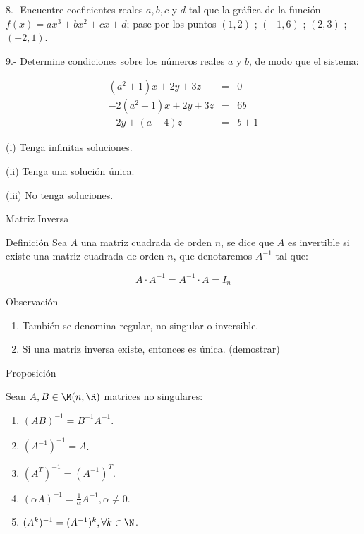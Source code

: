 8.- Encuentre coeficientes reales $a, b, c$ y $d$ tal que la gráfica
  de la función $f(x)= ax^3 + bx^2+ cx + d$;
pase por los puntos $(1,2)$ ; $(-1,6)$ ; $(2,3)$ ; $(-2,1)$.

9.- Determine condiciones sobre los números reales $a$ y $b$,
 de modo que el sistema:
 
 \begin{eqnarray*}
(a^2+1)x   +  2y + 3z     &=& 0\\
-2(a^2+1)x +  2y + 3z     &=& 6b\\
           -  2y + (a-4)z &=& b+1
\end{eqnarray*}

(i) Tenga infinitas soluciones.

(ii) Tenga una solución única.

(iii) No tenga soluciones.


{Matriz Inversa}

\begin{block}{Definición}
Sea $A$ una matriz cuadrada de orden $n$, se dice que $A$ es invertible  si existe una matriz  cuadrada de orden $n$, que denotaremos $A^{-1}$ tal que:

$$A \cdot A^{-1} = A^{-1}  \cdot A = I_n$$

\end{block}


\begin{block}{Observación}
\begin{enumerate}
\item
También se denomina regular, no singular o inversible.

\item
Si una matriz inversa existe, entonces es única.
(demostrar)
\end{enumerate}
\end{block}


{Proposición}

Sean $A,B \in \M(n,\R)$ matrices no singulares:

\begin{enumerate}
\item
$(AB)^{-1} = B^{-1}A^{-1}$.
\item
$(A^{-1} )^{-1} = A$.
\item
$(A^T )^{-1} = (A^{-1} )^T$.
\item
$(\alpha A)^{-1}  = \frac{1}{\alpha} A^{-1}, \alpha  \neq 0 $.
\item
$(A^k )^{-1} = (A^{-1} )^k, \forall k \in \N$.
\end{enumerate}


